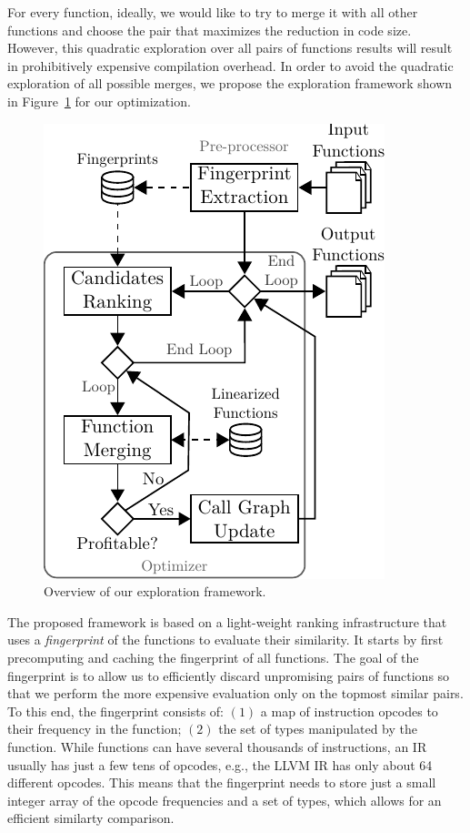 For every function, ideally, we would like to try to merge it with all other functions and choose the pair that maximizes the reduction in
code size. However, this quadratic exploration over all pairs of functions results will result in prohibitively expensive compilation
overhead. In order to avoid the quadratic exploration of all possible merges, we propose the exploration framework shown in
Figure~\ref{fig:func-merge-opt-arch} for our optimization.
\begin{figure}[t!]
  \centering
  \includegraphics[width=0.65\linewidth]{figs/func-merge-opt-arch.pdf}
  \caption{Overview of our exploration framework.}
  \label{fig:func-merge-opt-arch}
\end{figure}

The proposed framework is based on a light-weight ranking infrastructure that uses a \textit{fingerprint} of the functions to evaluate
their similarity. It starts by first precomputing and caching the fingerprint of all functions. The goal of the fingerprint is to allow us
to efficiently discard unpromising pairs of functions so that we perform the more expensive evaluation only on the topmost similar pairs.
To this end, the fingerprint consists of: $(1)$ a map of instruction opcodes to their frequency in the function; $(2)$ the set of types
manipulated by the function. While functions can have several thousands of instructions, an IR usually has just a few tens of opcodes,
e.g., the LLVM IR has only about 64 different opcodes. This means that the fingerprint needs to store just a small integer array of the
opcode frequencies and a set of types, which allows for an efficient similarty comparison.

